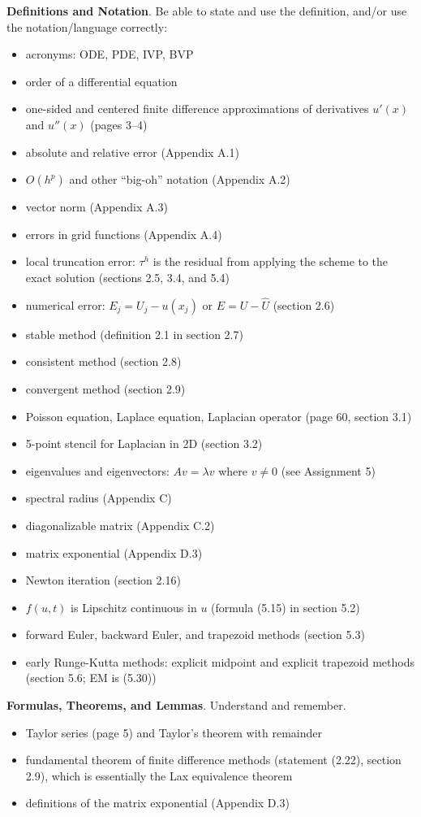 \documentclass[12pt]{amsart}
\newcommand{\bigspacing}{\renewcommand{\baselinestretch}{1.15}\tiny\normalsize}
\begin{document}
\bigspacing
\noindent \textbf{Definitions and Notation}.  Be able to state and use the definition, and/or use the notation/language correctly:
\begin{itemize}
\item acronyms: ODE, PDE, IVP, BVP
\item order of a differential equation
\item one-sided and centered finite difference approximations of derivatives $u'(x)$ and $u''(x)$ (pages 3--4)
\item absolute and relative error (Appendix A.1)
\item $O(h^p)$ and other ``big-oh'' notation (Appendix A.2)
\item vector norm (Appendix A.3)
\item errors in grid functions (Appendix A.4)
\item local truncation error: $\tau^h$ is the residual from applying the scheme to the exact solution (sections 2.5, 3.4, and 5.4)
\item numerical error: $E_j = U_j - u(x_j)$ or $E = U - \hat U$ (section 2.6)
\item stable method (definition 2.1 in section 2.7)
\item consistent method (section 2.8)
\item convergent method (section 2.9)
\item Poisson equation, Laplace equation, Laplacian operator (page 60, section 3.1)
\item 5-point stencil for Laplacian in 2D (section 3.2)
\item eigenvalues and eigenvectors: $A v = \lambda v$ where $v\ne 0$ (see Assignment 5)
\item spectral radius (Appendix C)
\item diagonalizable matrix (Appendix C.2)
\item matrix exponential (Appendix D.3)
\item Newton iteration (section 2.16)
\item $f(u,t)$ is Lipschitz continuous in $u$ (formula (5.15) in section 5.2)
\item forward Euler, backward Euler, and trapezoid methods (section 5.3)
\item early Runge-Kutta methods: explicit midpoint and explicit trapezoid methods (section 5.6; EM is (5.30))
\end{itemize}

\bigskip

\noindent \textbf{Formulas, Theorems, and Lemmas}.  Understand and remember.
\begin{itemize}
\item Taylor series (page 5) and Taylor's theorem with remainder
\item fundamental theorem of finite difference methods (statement (2.22), section 2.9), which is essentially the Lax equivalence theorem
\item definitions of the matrix exponential (Appendix D.3)
\end{itemize}
\end{document}
